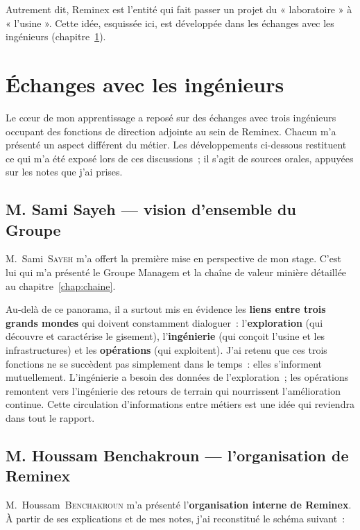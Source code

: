 \documentclass[12pt,a4paper,oneside]{report}
\begin{document}
Autrement dit, Reminex est l'entité qui fait passer un projet du « laboratoire » à « l'usine ». Cette idée, esquissée ici, est développée dans les échanges avec les ingénieurs (chapitre~\ref{chap:ingenieurs}).
\chapter{Échanges avec les ingénieurs}
\label{chap:ingenieurs}

Le cœur de mon apprentissage a reposé sur des échanges avec trois ingénieurs occupant des fonctions de direction adjointe au sein de Reminex. Chacun m'a présenté un aspect différent du métier. Les développements ci-dessous restituent ce qui m'a été exposé lors de ces discussions~; il s'agit de sources orales, appuyées sur les notes que j'ai prises.

\section{M. Sami Sayeh --- vision d'ensemble du Groupe}

M.~Sami~\textsc{Sayeh} m'a offert la première mise en perspective de mon stage. C'est lui qui m'a présenté le Groupe Managem et la chaîne de valeur minière détaillée au chapitre~\ref{chap:chaine}.

Au-delà de ce panorama, il a surtout mis en évidence les \textbf{liens entre trois grands mondes} qui doivent constamment dialoguer~: l'\textbf{exploration} (qui découvre et caractérise le gisement), l'\textbf{ingénierie} (qui conçoit l'usine et les infrastructures) et les \textbf{opérations} (qui exploitent). J'ai retenu que ces trois fonctions ne se succèdent pas simplement dans le temps~: elles s'informent mutuellement. L'ingénierie a besoin des données de l'exploration~; les opérations remontent vers l'ingénierie des retours de terrain qui nourrissent l'amélioration continue. Cette circulation d'informations entre métiers est une idée qui reviendra dans tout le rapport.

\section{M. Houssam Benchakroun --- l'organisation de Reminex}

M.~Houssam~\textsc{Benchakroun} m'a présenté l'\textbf{organisation interne de Reminex}. À partir de ses explications et de mes notes, j'ai reconstitué le schéma suivant~:
\end{document}
